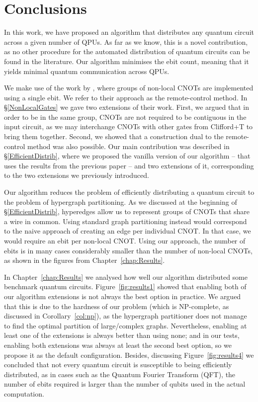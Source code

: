 \chapter{Conclusions}
\label{chap:Conclusions}

In this work, we have proposed an algorithm that distributes any quantum circuit across a given number of QPUs. As far as we know, this is a novel contribution, as no other procedure for the automated distribution of quantum circuits can be found in the literature. Our algorithm minimises the ebit count, meaning that it yields minimal quantum communication across QPUs.

We make use of the work by \citet{NonLocalCNOT}, where groups of non-local CNOTs are implemented using a single ebit. We refer to their approach as the remote-control method. In \S\ref{NonLocalGates} we gave two extensions of their work. First, we argued that in order to be in the same group, CNOTs are not required to be contiguous in the input circuit, as we may interchange CNOTs with other gates from Clifford+T to bring them together. Second, we showed that a construction dual to the remote-control method was also possible. Our main contribution was described in \S\ref{EfficientDistrib}, where we proposed the vanilla version of our algorithm -- that uses the results from the previous paper -- and two extensions of it, corresponding to the two extensions we previously introduced. 

Our algorithm reduces the problem of efficiently distributing a quantum circuit to the problem of hypergraph partitioning. As we discussed at the beginning of \S\ref{EfficientDistrib}, hyperedges allow us to represent groups of CNOTs that share a wire in common. Using standard graph partitioning instead would correspond to the naive approach of creating an edge per individual CNOT. In that case, we would require an ebit per non-local CNOT. Using our approach, the number of ebits is in many cases considerably smaller than the number of non-local CNOTs, as shown in the figures from Chapter~\ref{chap:Results}.

In Chapter~\ref{chap:Results} we analysed how well our algorithm distributed some benchmark quantum circuits. Figure~\ref{fig:results1} showed that enabling both of our algorithm extensions is not always the best option in practice. We argued that this is due to the hardness of our problem (which is NP-complete, as discussed in Corollary~\ref{col:np}), as the hypergraph partitioner does not manage to find the optimal partition of large/complex graphs. Nevertheless, enabling at least one of the extensions is always better than using none; and in our tests, enabling both extensions was always at least the second best option, so we propose it as the default configuration. Besides, discussing Figure~\ref{fig:results4} we concluded that not every quantum circuit is susceptible to being efficiently distributed, as in cases such as the Quantum Fourier Transform (QFT), the number of ebits required is larger than the number of qubits used in the actual computation. 

